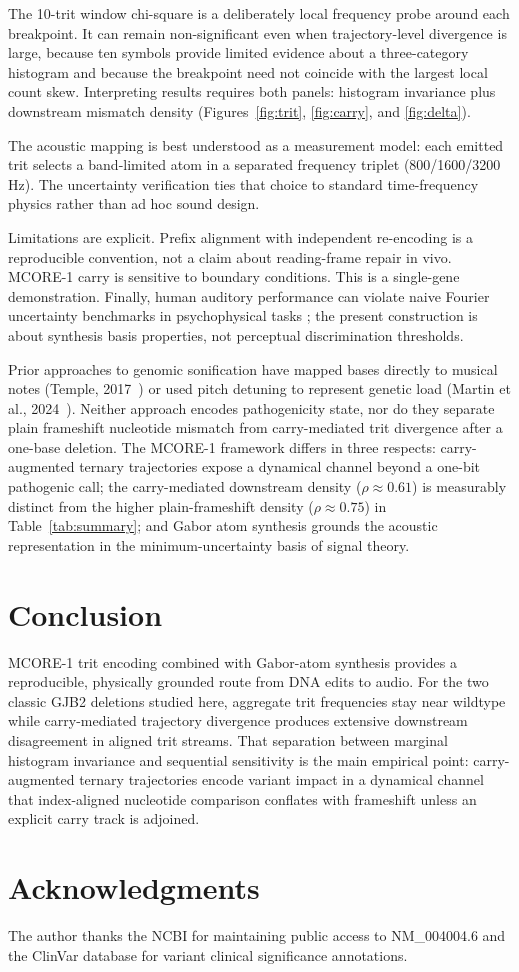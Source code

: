 \documentclass[preprint,12pt]{elsarticle}
\begin{document}
The 10-trit window chi-square is a deliberately local frequency probe around each breakpoint. It can remain non-significant even when trajectory-level divergence is large, because ten symbols provide limited evidence about a three-category histogram and because the breakpoint need not coincide with the largest local count skew. Interpreting results requires both panels: histogram invariance plus downstream mismatch density (Figures~\ref{fig:trit}, \ref{fig:carry}, and \ref{fig:delta}).

The acoustic mapping is best understood as a measurement model: each emitted trit selects a band-limited atom in a separated frequency triplet (800/1600/3200\,Hz). The uncertainty verification ties that choice to standard time-frequency physics rather than ad hoc sound design.

Limitations are explicit. Prefix alignment with independent re-encoding is a reproducible convention, not a claim about reading-frame repair in vivo. MCORE-1 carry is sensitive to boundary conditions. This is a single-gene demonstration. Finally, human auditory performance can violate naive Fourier uncertainty benchmarks in psychophysical tasks \citep{oppenheim2013human}; the present construction is about synthesis basis properties, not perceptual discrimination thresholds.

Prior approaches to genomic sonification have mapped bases directly to musical notes (Temple, 2017~\citep{temple2017dna}) or used pitch detuning to represent genetic load (Martin et al., 2024~\citep{martin2024genomic}). Neither approach encodes pathogenicity state, nor do they separate plain frameshift nucleotide mismatch from carry-mediated trit divergence after a one-base deletion. The MCORE-1 framework differs in three respects: carry-augmented ternary trajectories expose a dynamical channel beyond a one-bit pathogenic call; the carry-mediated downstream density ($\rho\approx 0.61$) is measurably distinct from the higher plain-frameshift density ($\rho\approx 0.75$) in Table~\ref{tab:summary}; and Gabor atom synthesis grounds the acoustic representation in the minimum-uncertainty basis of signal theory.

\section{Conclusion}

MCORE-1 trit encoding combined with Gabor-atom synthesis provides a reproducible, physically grounded route from DNA edits to audio. For the two classic GJB2 deletions studied here, aggregate trit frequencies stay near wildtype while carry-mediated trajectory divergence produces extensive downstream disagreement in aligned trit streams. That separation between marginal histogram invariance and sequential sensitivity is the main empirical point: carry-augmented ternary trajectories encode variant impact in a dynamical channel that index-aligned nucleotide comparison conflates with frameshift unless an explicit carry track is adjoined.

\section*{Acknowledgments}
The author thanks the NCBI for maintaining public access to NM\_004004.6 and the ClinVar database for variant clinical significance annotations.



\end{document}

